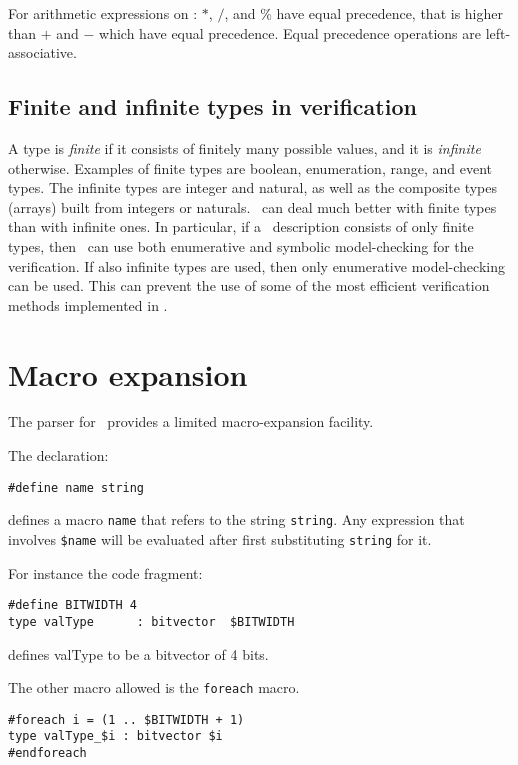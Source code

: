 {For arithmetic expressions on \sizeconst: $*$, $/$, and $\%$ have
equal precedence, that is higher than $+$ and $-$ which have equal
precedence. Equal precedence operations are left-associative. 
        
\subsection{Finite and infinite types in
verification} 

A type is {\em finite\/} if it consists of finitely many possible
values, and it is {\em infinite\/} otherwise.  Examples of finite
types are boolean, enumeration, range, and event types.  
The infinite types are integer and natural, as well as the composite
types (arrays) built from integers or naturals. 
\mocha\ can deal much better with finite types than with infinite
ones.  In particular, if a \rem\ description consists of
only finite types, then \mocha\ can use both
enumerative and symbolic
model-checking for the verification. 
If also infinite types are used, then only enumerative
model-checking can be used.  This
can prevent the use of some of the most efficient verification methods
implemented in \mocha. 

\section{Macro expansion}
The parser for \rem\ provides a limited macro-expansion facility. 

\mypar
The declaration:

\mypar
{\tt \#define name string} 

\mypar
defines a macro {\tt name} that refers to the string {\tt string}. Any
expression that involves {\tt \$name} will be evaluated after first
substituting {\tt string} for it. 

\mypar
For instance the code fragment:
\begin{verbatim}
#define BITWIDTH 4
type valType      : bitvector  $BITWIDTH
\end{verbatim}
defines valType to be a bitvector of 4 bits. 

\mypar
The other macro allowed is the {\tt foreach} macro. 

\mypar
\begin{verbatim}
#foreach i = (1 .. $BITWIDTH + 1)
type valType_$i : bitvector $i
#endforeach
\end{verbatim}

}

